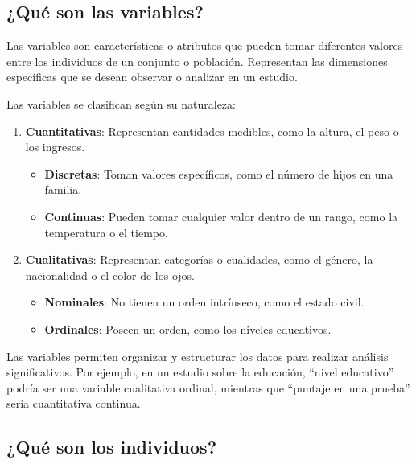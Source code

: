 \documentclass[
  letterpaper,
  DIV=11,
  numbers=noendperiod]{scrreprt}
\providecommand{\tightlist}{%
  \setlength{\itemsep}{0pt}\setlength{\parskip}{0pt}}\usepackage{longtable,booktabs,array}
\begin{document}
\subsection{¿Qué son las variables?}\label{quuxe9-son-las-variables}

Las variables son características o atributos que pueden tomar
diferentes valores entre los individuos de un conjunto o población.
Representan las dimensiones específicas que se desean observar o
analizar en un estudio.

Las variables se clasifican según su naturaleza:

\begin{enumerate}
\def\labelenumi{\arabic{enumi}.}
\item
  \textbf{Cuantitativas}: Representan cantidades medibles, como la
  altura, el peso o los ingresos.

  \begin{itemize}
  \tightlist
  \item
    \textbf{Discretas}: Toman valores específicos, como el número de
    hijos en una familia.\\
  \item
    \textbf{Continuas}: Pueden tomar cualquier valor dentro de un rango,
    como la temperatura o el tiempo.
  \end{itemize}
\item
  \textbf{Cualitativas}: Representan categorías o cualidades, como el
  género, la nacionalidad o el color de los ojos.

  \begin{itemize}
  \tightlist
  \item
    \textbf{Nominales}: No tienen un orden intrínseco, como el estado
    civil.\\
  \item
    \textbf{Ordinales}: Poseen un orden, como los niveles educativos.
  \end{itemize}
\end{enumerate}

Las variables permiten organizar y estructurar los datos para realizar
análisis significativos. Por ejemplo, en un estudio sobre la educación,
``nivel educativo'' podría ser una variable cualitativa ordinal,
mientras que ``puntaje en una prueba'' sería cuantitativa continua.

\subsection{¿Qué son los individuos?}\label{quuxe9-son-los-individuos}
\end{document}
